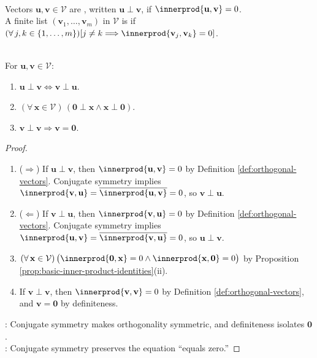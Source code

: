 \begin{definition} \label{def:orthogonal-vectors} \\
Vectors $\mathbf{u},\mathbf{v}\in\mathcal{V}$ are , written $\mathbf{u}\perp\mathbf{v}$, if $\innerprod{\mathbf{u},\mathbf{v}}=0$.\\
A finite list $(\mathbf{v}_1,\ldots,\mathbf{v}_m)$ in $\mathcal{V}$ is  if $(\forall\,j,k\in\{1,\ldots,m\})[j\neq k\Longrightarrow\innerprod{\mathbf{v}_j,\mathbf{v}_k}=0]$.
\end{definition}

\begin{proposition} \label{prop:orthogonality-and-zero} \\
For $\mathbf{u},\mathbf{v}\in\mathcal{V}$:
\begin{enumerate}[label=(\roman*)]
\setlength{\itemsep}{0pt}
\item $\mathbf{u}\perp\mathbf{v}\Longleftrightarrow\mathbf{v}\perp\mathbf{u}$.
\item $(\forall\,\mathbf{x}\in\mathcal{V})\,(\mathbf{0}\perp\mathbf{x}\land\mathbf{x}\perp\mathbf{0})$.
\item $\mathbf{v}\perp\mathbf{v}\Longrightarrow\mathbf{v}=\mathbf{0}$.
\end{enumerate}
\begin{proof}
\begin{enumerate}[label=(\roman*)]
\setlength{\itemsep}{0pt}
\item[$(i)$] ($\Rightarrow$) If $\mathbf{u}\perp\mathbf{v}$, then $\innerprod{\mathbf{u},\mathbf{v}}=0$ by Definition \ref{def:orthogonal-vectors}. Conjugate symmetry implies $\innerprod{\mathbf{v},\mathbf{u}}=\overline{\innerprod{\mathbf{u},\mathbf{v}}}=0$, so $\mathbf{v}\perp\mathbf{u}$.
\item[$(i)$] ($\Leftarrow$) If $\mathbf{v}\perp\mathbf{u}$, then $\innerprod{\mathbf{v},\mathbf{u}}=0$ by Definition \ref{def:orthogonal-vectors}. Conjugate symmetry implies $\innerprod{\mathbf{u},\mathbf{v}}=\overline{\innerprod{\mathbf{v},\mathbf{u}}}=0$, so $\mathbf{u}\perp\mathbf{v}$.
\item[$(ii)$] $(\forall\,\mathbf{x}\in\mathcal{V})\,\bigl(\innerprod{\mathbf{0},\mathbf{x}}=0\land\innerprod{\mathbf{x},\mathbf{0}}=0\bigr)$ by Proposition \ref{prop:basic-inner-product-identities}(ii).
\item[$(iii)$] If $\mathbf{v}\perp\mathbf{v}$, then $\innerprod{\mathbf{v},\mathbf{v}}=0$ by Definition \ref{def:orthogonal-vectors}, and $\mathbf{v}=\mathbf{0}$ by definiteness.
\end{enumerate}
: Conjugate symmetry makes orthogonality symmetric, and definiteness isolates $\mathbf{0}$.\\
: Conjugate symmetry preserves the equation ``equals zero.''
\end{proof}
\end{proposition}

